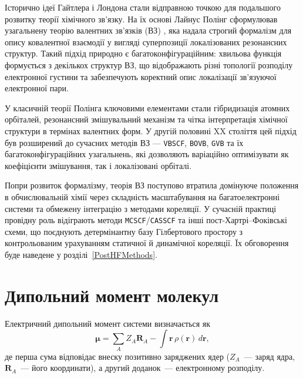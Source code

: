 \begin{commentbox}
	Історично ідеї Гайтлера і Лондона стали відправною точкою
	для подальшого розвитку теорії хімічного зв’язку.
	На їх основі Лайнус Полінг сформулював узагальнену
	теорію валентних зв’язків (ВЗ) , яка надала строгий формалізм
	для опису ковалентної взаємодії у вигляді суперпозиції
	локалізованих резонансних структур.
	Такий підхід природно є багатоконфігураційним:
	хвильова функція формується з декількох структур ВЗ,
	що відображають різні топології розподілу електронної густини
	та забезпечують коректний опис локалізації зв’язуючої електронної пари.

	У класичній теорії Полінга ключовими елементами стали
	гібридизація атомних орбіталей, резонансний змішувальний механізм
	та чітка інтерпретація хімічної структури в термінах валентних форм.
	У другій половині XX століття цей підхід був розширений
	до сучасних методів ВЗ --- \texttt{VBSCF}, \texttt{BOVB}, \texttt{GVB}
	та їх багатоконфігураційних узагальнень,
	які дозволяють варіаційно оптимізувати як коефіцієнти змішування,
	так і локалізовані орбіталі.

	Попри розвиток формалізму, теорія ВЗ поступово втратила
	домінуюче положення в обчислювальній хімії
	через складність масштабування на багатоелектронні системи
	та обмежену інтеграцію з методами кореляції.
	У сучасній практиці провідну роль відіграють методи
	\texttt{MCSCF}/\texttt{CASSCF} та інші пост-Хартрі–Фоківські схеми,
	що поєднують детермінантну базу Гілбертового простору
	з контрольованим урахуванням статичної й динамічної кореляції.
	Їх обговорення буде наведене у розділі~\ref{PostHFMethods}.
\end{commentbox}


\section{Дипольний момент молекул}

Електричний дипольний момент системи визначається як
\begin{equation}
	\boldsymbol{\mu} = \sum_A Z_A \mathbf{R}_A
	- \int \mathbf{r}\,\rho(\mathbf{r})\,d\mathbf{r},
\end{equation}
де перша сума відповідає внеску позитивно заряджених ядер
($Z_A$~--- заряд ядра, $\mathbf{R}_A$~— його координати),
а другий доданок~--- електронному розподілу.

